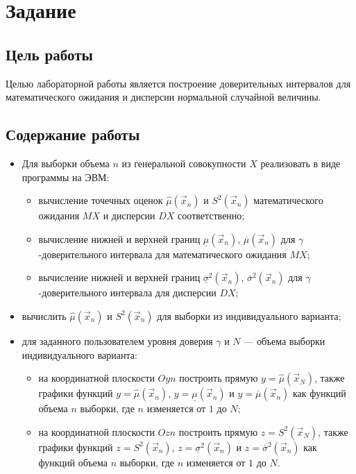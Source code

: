 \section{Задание}
\subsection{Цель работы}
Целью лабораторной работы является построение доверительных интервалов для 
математического ожидания и дисперсии нормальной случайной величины.

\subsection{Содержание работы}
\begin{itemize}
    \item Для выборки объема $n$ из генеральной совокупности $X$ реализовать в
        виде программы на ЭВМ:
        \begin{itemize}
            \item вычисление точечных оценок $\hat \mu(\vec x_n)$ и $S^2(\vec
                x_n)$ математического ожидания $MX$ и дисперсии
                $DX$ соответственно;
            \item вычисление нижней и верхней границ $\underline \mu (\vec
                x_n)$, $\overline \mu (\vec x_n)$ для
                $\gamma$-доверительного интервала для математического
                ожидания $MX$;
            \item вычисление нижней и верхней границ $\underline \sigma^2 (\vec
                x_n)$, $\overline \sigma^2 (\vec x_n)$ для
                $\gamma$-доверительного интервала для дисперсии
                $DX$;
        \end{itemize}
    \item вычислить $\hat \mu(\vec x_n)$ и $S^2(\vec x_n)$ для выборки из
        индивидуального варианта;
    \item для заданного пользователем уровня доверия $\gamma$ и $N$ --- объема
        выборки индивидуального варианта:
        \begin{itemize}
            \item на координатной плоскости $Oyn$ построить прямую \mbox{$y=\hat \mu
                (\vec x_N)$}, также графики функций $y=\hat \mu (\vec x_n)$,
               $y=\underline \mu (\vec x_n)$ и $y=\overline \mu (\vec x_n)$
               как функций объема $n$ выборки, где $n$ изменяется от $1$
               до $N$;
            \item на координатной плоскости $Ozn$ построить прямую
                \mbox{$z=S^2 (\vec x_N)$}, также графики функций $z=S^2 (\vec
                x_n)$, $z=\underline \sigma^2 (\vec x_n)$ и \mbox{$z=\overline
                \sigma^2 (\vec x_n)$} как функций объема $n$ выборки, где $n$
                изменяется от $1$ до $N$.
        \end{itemize}

\end{itemize}